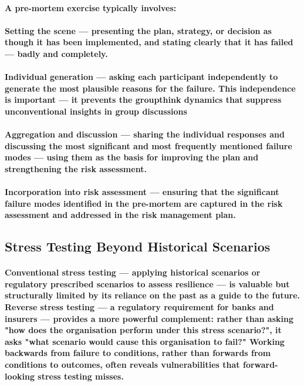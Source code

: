 \paragraph{A pre-mortem exercise typically involves:}
\paragraph{\textbf{Setting the scene} — presenting the plan, strategy, or decision as though it has been implemented, and stating clearly that it has failed — badly and completely.}
\paragraph{\textbf{Individual generation} — asking each participant independently to generate the most plausible reasons for the failure. This independence is important — it prevents the groupthink dynamics that suppress unconventional insights in group discussions}
\paragraph{\textbf{Aggregation and discussion} — sharing the individual responses and discussing the most significant and most frequently mentioned failure modes — using them as the basis for improving the plan and strengthening the risk assessment.}
\paragraph{\textbf{Incorporation into risk assessment} — ensuring that the significant failure modes identified in the pre-mortem are captured in the risk assessment and addressed in the risk management plan.}

\subsection{Stress Testing Beyond Historical Scenarios}
\paragraph{Conventional stress testing — applying historical scenarios or regulatory prescribed scenarios to assess resilience — is valuable but structurally limited by its reliance on the past as a guide to the future. \textbf{Reverse stress testing} — a regulatory requirement for banks and insurers — provides a more powerful complement: rather than asking "how does the organisation perform under this stress scenario?", it asks "what scenario would cause this organisation to fail?" Working backwards from failure to conditions, rather than forwards from conditions to outcomes, often reveals vulnerabilities that forward-looking stress testing misses.}
